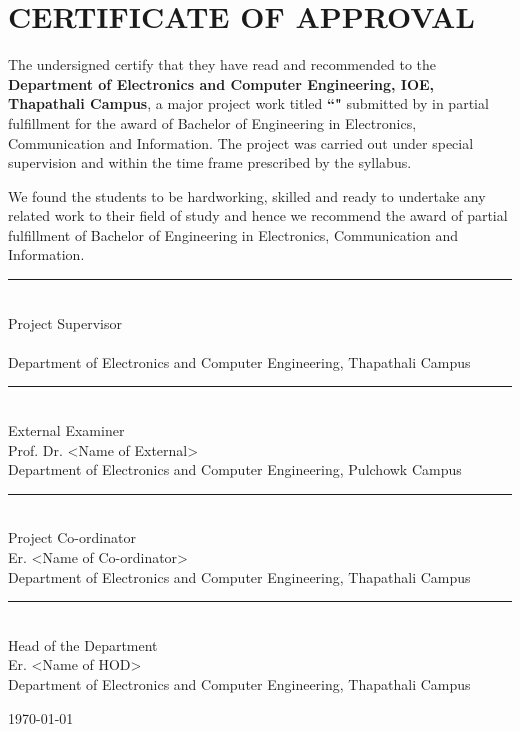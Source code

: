 \section*{CERTIFICATE OF APPROVAL}
    The undersigned certify that they have read and recommended to the \textbf{Department of Electronics and Computer Engineering, IOE, Thapathali Campus}, a major project work titled \textbf{``\titlename"} submitted by \textbf{\authornames} in partial fulfillment for the award of Bachelor of Engineering in Electronics, Communication and Information. The project was carried out under special supervision and within the time frame prescribed by the syllabus.
    
    We found the students to be hardworking, skilled and ready to undertake any related work to their field of study and hence we recommend the award of partial fulfillment of Bachelor of Engineering in Electronics, Communication and Information.

   
    \vspace{\baselineskip}
    
    \rule{0.5\textwidth}{0.4pt}\\
    Project Supervisor\\
    \supervisorname\\
    Department of Electronics and Computer Engineering, Thapathali Campus

    \vspace{\baselineskip}
    
    \rule{0.5\textwidth}{0.4pt}\\
    External Examiner\\
    Prof. Dr. \textless Name of External\textgreater\\
    Department of Electronics and Computer Engineering, Pulchowk Campus

    \vspace{\baselineskip}
    
    \rule{0.5\textwidth}{0.4pt}\\
    Project Co-ordinator\\
    Er. \textless Name of Co-ordinator\textgreater\\
    Department of Electronics and Computer Engineering, Thapathali Campus

    \vspace{\baselineskip}
    
    \rule{0.5\textwidth}{0.4pt}\\
    Head of the Department\\
    Er. \textless Name of HOD\textgreater\\
    Department of Electronics and Computer Engineering, Thapathali Campus

    \vspace{\baselineskip}
    \today

    